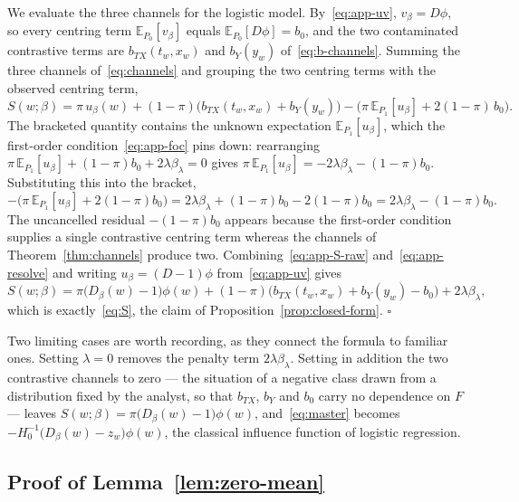 \documentclass[11pt]{article}
\theoremstyle{plain}
\theoremstyle{definition}
\theoremstyle{remark}
\newcommand{\pE}{\ensuremath{\mathbb{E}}}
\newcommand{\ratio}{\ensuremath{\pi}}
\newcommand{\score}{S}
\begin{document}
We evaluate the three channels for the logistic model. By~\eqref{eq:app-uv}, $v_\beta = D\phi$,
so every centring term $\pE_{P_0}[v_\beta]$ equals $\pE_{P_0}[D\phi] = b_0$, and the two
contaminated contrastive terms are $b_{TX}(t_w,x_w)$ and $b_Y(y_w)$ of~\eqref{eq:b-channels}.
Summing the three channels of~\eqref{eq:channels} and grouping the two centring terms with the
observed centring term,
\begin{equation}
\score(w;\beta)
= \ratio\,u_\beta(w) + (1-\ratio)\big( b_{TX}(t_w,x_w) + b_Y(y_w) \big)
- \Big( \ratio\,\pE_{P_1}[u_\beta] + 2(1-\ratio)\,b_0 \Big).
\label{eq:app-S-raw}
\end{equation}
The bracketed quantity contains the unknown expectation $\pE_{P_1}[u_\beta]$, which the
first-order condition~\eqref{eq:app-foc} pins down: rearranging
$\ratio\,\pE_{P_1}[u_\beta] + (1-\ratio)b_0 + 2\lambda\beta_\lambda = 0$ gives
$\ratio\,\pE_{P_1}[u_\beta] = -2\lambda\beta_\lambda - (1-\ratio)b_0$. Substituting this into the
bracket,
\begin{equation}
-\Big( \ratio\,\pE_{P_1}[u_\beta] + 2(1-\ratio)b_0 \Big)
= 2\lambda\beta_\lambda + (1-\ratio)b_0 - 2(1-\ratio)b_0
= 2\lambda\beta_\lambda - (1-\ratio)b_0 .
\label{eq:app-resolve}
\end{equation}
The uncancelled residual $-(1-\ratio)b_0$ appears because the first-order condition supplies a
single contrastive centring term whereas the channels of Theorem~\ref{thm:channels} produce
two. Combining~\eqref{eq:app-S-raw} and~\eqref{eq:app-resolve} and writing
$u_\beta = (D-1)\phi$ from~\eqref{eq:app-uv} gives
\[
\score(w;\beta)
= \ratio\big(D_\beta(w)-1\big)\phi(w)
+ (1-\ratio)\big(b_{TX}(t_w,x_w) + b_Y(y_w) - b_0\big)
+ 2\lambda\beta_\lambda,
\]
which is exactly~\eqref{eq:S}, the claim of Proposition~\ref{prop:closed-form}. \hfill$\square$

Two limiting cases are worth recording, as they connect the formula to familiar ones. Setting
$\lambda = 0$ removes the penalty term $2\lambda\beta_\lambda$. Setting in addition the two
contrastive channels to zero --- the situation of a negative class drawn from a distribution
fixed by the analyst, so that $b_{TX}$, $b_Y$ and $b_0$ carry no dependence on $F$ --- leaves
$\score(w;\beta) = \ratio\big(D_\beta(w)-1\big)\phi(w)$, and~\eqref{eq:master} becomes
$-H_0^{-1}\big(D_\beta(w) - z_w\big)\phi(w)$, the classical influence function of logistic
regression.

\subsection{Proof of Lemma~\ref{lem:zero-mean}}
\label{app:logistic-zero-mean}
\end{document}
